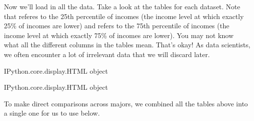 \documentclass[letterpaper,10pt,english]{jupyterBook}
\begin{document}
\sphinxAtStartPar
Now we’ll load in all the data.
Take a look at the tables for each dataset.
Note that  referes to the 25th percentile of incomes (the income level at which exactly 25\% of incomes are lower) and  refers to the 75th percentile of incomes (the income level at which exactly 75\% of incomes are lower).
You may not know what all the different columns in the tables mean. That’s okay!
As data scientists, we often encounter a lot of irrelevant data that we will discard later.

\begin{sphinxVerbatim}[commandchars=\\\{\}]
  
\end{sphinxVerbatim}

\begin{sphinxVerbatim}[commandchars=\\\{\}]
\PYGZlt{}IPython.core.display.HTML object\PYGZgt{}
\end{sphinxVerbatim}

\begin{sphinxVerbatim}[commandchars=\\\{\}]
   
\end{sphinxVerbatim}

\begin{sphinxVerbatim}[commandchars=\\\{\}]
\PYGZlt{}IPython.core.display.HTML object\PYGZgt{}
\end{sphinxVerbatim}

\sphinxAtStartPar
To make direct comparisons across majors, we combined all the tables above into a single one for us to use below.

\begin{sphinxVerbatim}[commandchars=\\\{\}]
  
\end{sphinxVerbatim}
\end{document}
